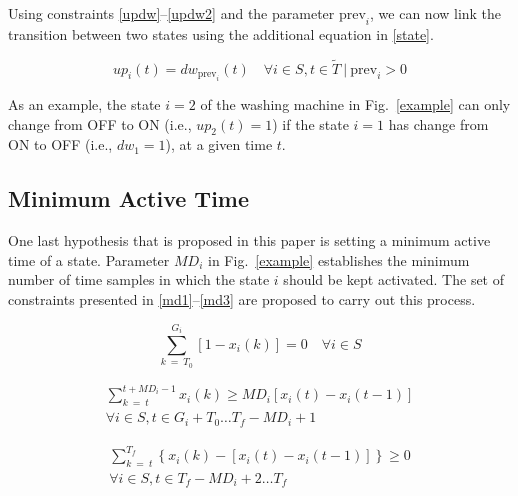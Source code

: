 
Using constraints \eqref{updw}--\eqref{updw2} and the parameter $\text{prev}_i$, we can now link the transition between two states using the additional equation in \eqref{state}.

\begin{equation} \label{state}
    up_i(t) = dw_{\text{prev}_i}(t) \quad \forall i \in S, t \in \tilde{T} \ | \ \text{prev}_i>0
\end{equation}

As an example, the state $i = 2$ of the washing machine in Fig.~\ref{example} can only change from OFF to ON (i.e., $up_2(t) = 1$) if the state $i = 1$ has change from ON to OFF (i.e., $dw_1 = 1$), at a given time $t$.

\subsection{Minimum Active Time}

One last hypothesis that is proposed in this paper is setting a minimum active time of a state. Parameter $MD_i$ in Fig.~\ref{example} establishes the minimum number of time samples in which the state $i$ should be kept activated. The set of constraints presented in \eqref{md1}--\eqref{md3} are proposed to carry out this process. 

\begin{equation}\label{md1}
    \sum_{k\ =\ T_0}^{G_i} \left[ 1 - x_i(k) \right] = 0 \quad \forall i \in S
\end{equation}

\begin{multline}\label{md2}
    \sum_{k\ =\ t}^{t+MD_i-1} x_i(k) \geq MD_i \left[ x_i(t) - x_i(t-1) \right] \\
    \forall i \in S, t \in G_i + T_0 \hdots T_f - {MD}_i + 1
\end{multline}

\begin{multline} \label{md3}
    \sum_{k\ =\ t}^{T_f} \left\{ x_i(k) - \left[ x_i(t) - x_i(t-1) \right] \right\} \geq 0 \\
    \forall i \in S, t \in T_f - MD_i + 2 \hdots T_f 
\end{multline}

